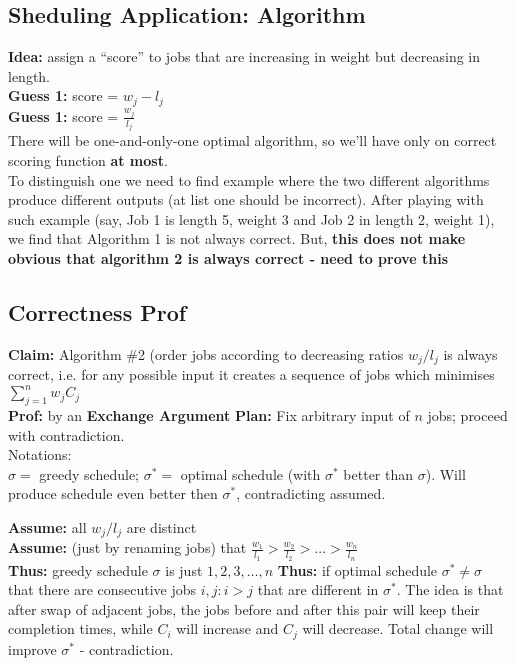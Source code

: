 \documentclass{scrartcl}
\begin{document}
\subsection{Sheduling Application: Algorithm}
\label{sec:4-2} {\bf Idea:} assign a ``score'' to jobs that are increasing in
weight but
decreasing in length. \\
{\bf Guess 1:} score = $w_j - l_j$\\
{\bf Guess 1:} score = $\frac{w_j}{l_j}$\\
There will be one-and-only-one optimal algorithm, so we'll have only on correct
scoring function {\bf at most}. \\
To distinguish one we need to find example where the two different algorithms
produce different outputs (at list one should be incorrect). After playing with
such example (say, Job 1 is length 5, weight 3 and Job 2 in length 2, weight 1),
we find that Algorithm 1 is not always correct. But, {\bf this does not make
  obvious that algorithm 2 is always correct - need to prove this}

\subsection{Correctness Prof}
\label{sec:4-3} {\bf Claim: } Algorithm \#2 (order jobs according to decreasing
ratios $w_j/l_j$ is always correct, i.e. for any possible input it creates a
sequence of jobs
which minimises $\sum \limits_{j=1}^n w_jC_j $ \\
{\bf Prof: } by an {\bf Exchange Argument}
{\bf Plan: } Fix arbitrary input of $n$ jobs; proceed with contradiction.\\
Notations:\\
$\sigma =$ greedy schedule; $\sigma^* = $ optimal schedule (with $\sigma^*$
better than $\sigma$). Will produce schedule even better then $\sigma^*$,
contradicting assumed.

{\bf Assume: } all $w_j/l_j$ are distinct \\
{\bf Assume: } (just by renaming jobs) that $\frac{w_1}{l_1} > \frac{w_2}{l_2} >
\dots > \frac{w_n}{l_n}$ \\
{\bf Thus: } greedy schedule $\sigma$ is just $1, 2, 3, \dots, n$ {\bf Thus: }
if optimal schedule $\sigma^* \neq \sigma$ that there are consecutive jobs $i,
j: i > j$ that are different in $\sigma^*$.
The idea is that after swap of adjacent jobs, the jobs before and after this
pair will keep their completion times, while $C_i$ will increase and $C_j$ will
decrease. Total change will improve $\sigma^*$ - contradiction.
\end{document}
